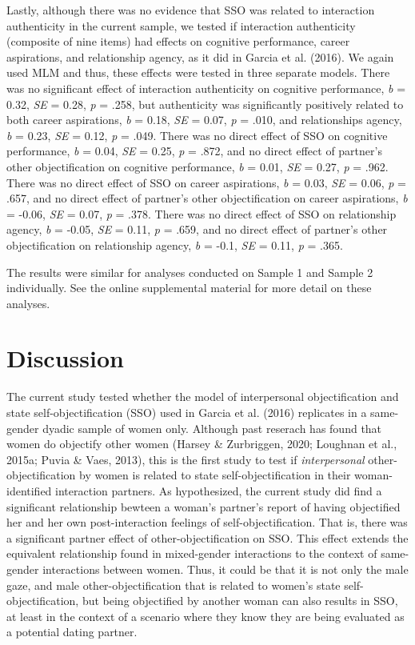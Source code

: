 \documentclass[
  man]{apa6}
\begin{document}
Lastly, although there was no evidence that SSO was related to
interaction authenticity in the current sample, we tested if interaction
authenticity (composite of nine items) had effects on cognitive
performance, career aspirations, and relationship agency, as it did in
Garcia et al. (2016). We again used MLM and thus, these effects were
tested in three separate models. There was no significant effect of
interaction authenticity on cognitive performance, \emph{b} = 0.32,
\emph{SE} = 0.28, \emph{p} = .258, but authenticity was significantly
positively related to both career aspirations, \emph{b} = 0.18,
\emph{SE} = 0.07, \emph{p} = .010, and relationships agency, \emph{b} =
0.23, \emph{SE} = 0.12, \emph{p} = .049. There was no direct effect of
SSO on cognitive performance, \emph{b} = 0.04, \emph{SE} = 0.25,
\emph{p} = .872, and no direct effect of partner's other objectification
on cognitive performance, \emph{b} = 0.01, \emph{SE} = 0.27, \emph{p} =
.962. There was no direct effect of SSO on career aspirations, \emph{b}
= 0.03, \emph{SE} = 0.06, \emph{p} = .657, and no direct effect of
partner's other objectification on career aspirations, \emph{b} = -0.06,
\emph{SE} = 0.07, \emph{p} = .378. There was no direct effect of SSO on
relationship agency, \emph{b} = -0.05, \emph{SE} = 0.11, \emph{p} =
.659, and no direct effect of partner's other objectification on
relationship agency, \emph{b} = -0.1, \emph{SE} = 0.11, \emph{p} = .365.

The results were similar for analyses conducted on Sample 1 and Sample 2
individually. See the online supplemental material for more detail on
these analyses.

\section{Discussion}\label{discussion}

The current study tested whether the model of interpersonal
objectification and state self-objectification (SSO) used in Garcia et
al. (2016) replicates in a same-gender dyadic sample of women only.
Although past reserach has found that women do objectify other women
(Harsey \& Zurbriggen, 2020; Loughnan et al., 2015a; Puvia \& Vaes,
2013), this is the first study to test if \emph{interpersonal}
other-objectification by women is related to state self-objectification
in their woman-identified interaction partners. As hypothesized, the
current study did find a significant relationship bewteen a woman's
partner's report of having objectified her and her own post-interaction
feelings of self-objectification. That is, there was a significant
partner effect of other-objectification on SSO. This effect extends the
equivalent relationship found in mixed-gender interactions to the
context of same-gender interactions between women. Thus, it could be
that it is not only the male gaze, and male other-objectification that
is related to women's state self-objectification, but being objectified
by another woman can also results in SSO, at least in the context of a
scenario where they know they are being evaluated as a potential dating
partner.
\end{document}
